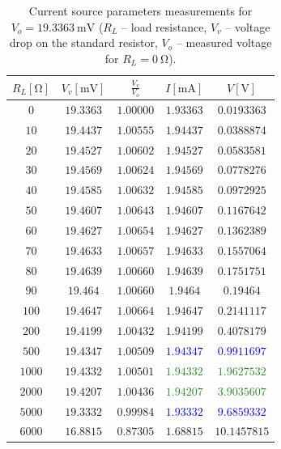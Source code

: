 \begin{table}[H]
	\centering
	\begin{tabular}{ c | c | c | c | c}
		$R_L [\unit{\ohm}]$ & $V_v[\unit{\milli\volt}]$ & $\frac{V_v}{V_o}$ & $I [\unit{\milli\ampere}]$ & $V [\unit{\volt}]$ \\
		\hline
		$0$ & $19.3363$ & $1.00000$ & $1.93363$ & $0.0193363$ \\
		$10$ & $19.4437$ & $1.00555$ & $1.94437$ & $0.0388874$ \\
		$20$ & $19.4527$ & $1.00602$ & $1.94527$ & $0.0583581$ \\
		$30$ & $19.4569$ & $1.00624$ & $1.94569$ & $0.0778276$ \\
		$40$ & $19.4585$ & $1.00632$ & $1.94585$ & $0.0972925$ \\
		$50$ & $19.4607$ & $1.00643$ & $1.94607$ & $0.1167642$ \\
		$60$ & $19.4627$ & $1.00654$ & $1.94627$ & $0.1362389$ \\
		$70$ & $19.4633$ & $1.00657$ & $1.94633$ & $0.1557064$ \\
		$80$ & $19.4639$ & $1.00660$ & $1.94639$ & $0.1751751$ \\
		$90$ & $19.464$ & $1.00660$ & $1.9464$ & $0.19464$ \\
		$100$ & $19.4647$ & $1.00664$ & \textcolor{BrickRed}{$1.94647$} & \textcolor{BrickRed}{$0.2141117$} \\
		$200$ & $19.4199$ & $1.00432$ & \textcolor{BrickRed}{$1.94199$} & \textcolor{BrickRed}{$0.4078179$} \\
		$500$ & $19.4347$ & $1.00509$ & \textcolor{blue}{$1.94347$} & \textcolor{blue}{$0.9911697$} \\
		$1000$ & $19.4332$ & $1.00501$ & \textcolor{ForestGreen}{$1.94332$} & \textcolor{ForestGreen}{$1.9627532$} \\
		$2000$ & $19.4207$ & $1.00436$ & \textcolor{ForestGreen}{$1.94207$} & \textcolor{ForestGreen}{$3.9035607$} \\
		$5000$ & $19.3332$ & $0.99984$ & \textcolor{blue}{$1.93332$} & \textcolor{blue}{$9.6859332$} \\
		$6000$ & $16.8815$ & $0.87305$ & $1.68815$ & $10.1457815$ \\
	\end{tabular}
	\caption {Current source parameters measurements for $V_o = \SI{19.3363}{\milli\volt}$ ($R_L$ -- load resistance,  $V_v$ -- voltage drop on the standard resistor, $V_o$ -- measured voltage for $R_L = \SI{0}{\ohm}$).}
	\label{tab:current}
\end{table}

